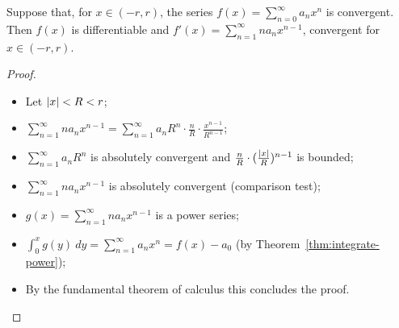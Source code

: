 \begin{theorem}
  \label{thm:differentiate-power}
  Suppose that, for \(x\in (-r,r)\), the series  \(f(x) = \sum_{n=0}^{\infty} a_n x^n\) is convergent.
  Then \(f(x)\) is differentiable and \(f'(x) =\sum_{n=1}^{\infty} n a_nx^{n-1}\), convergent for \(x\in (-r,r)\).
\end{theorem}



\begin{proof}
  \begin{itemize}
    \item Let \(\left|x\right|<R<r\);
    \item
          \(\sum_{n=1}^{\infty} n a_nx^{n-1}    = \sum_{n=1}^{\infty} a_n R^{n} \cdot \frac{n}{R} \cdot \frac{{x}^{n-1}}{R^{n-1}}\);
    \item \(\sum_{n=1}^{\infty} a_n R^n\) is absolutely convergent and \(  \frac{n}{R}  \cdot ( \frac{\left|x\right|}{R} )^{n-1}\) is bounded;
    \item \(\sum_{n=1}^{\infty} n a_nx^{n-1} \) is absolutely convergent
          (comparison test);
    \item \(g(x) =\sum_{n=1}^{\infty} n a_nx^{n-1} \) is a power series;
    \item \(\int_0^x g(y) \ dy = \sum_{n=1}^{\infty} a_nx^{n} = f(x) - a_0\) (by Theorem~\ref{thm:integrate-power});
    \item By the fundamental theorem of calculus this concludes the proof. \qedhere
  \end{itemize}
\end{proof}











